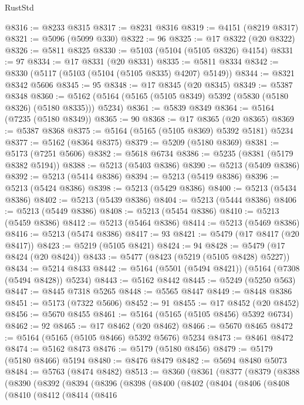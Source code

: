 \begin{lexlean}{RustStd}
\begin{coremodule}
@8316 := @8233 @8315
@8317 := @8231 @8316
@8319 := @4151 (@8219 @8317)
@8321 := @5096 (@5099 @330)
@8322 := 96
@8325 := @17 @8322 (@20 @8322)
@8326 := @5811 @8325
@8330 := @5103 (@5104 (@5105 @8326) @4154)
@8331 := 97
@8334 := @17 @8331 (@20 @8331)
@8335 := @5811 @8334
@8342 := @8330 (@5117 (@5103 (@5104 (@5105 @8335) @4207) @5149))
@8344 := @8321 @8342 @5606
@8345 := 95
@8348 := @17 @8345 (@20 @8345)
@8349 := @5387 @8348
@8360 := @5162 (@5164 (@5165 (@5105 @8349) @5392 (@5830 (@5180 @8326) (@5180 @8335))) @5234)
@8361 := @5839 @8349
@8364 := @5164 (@7235 (@5180 @8349))
@8365 := 90
@8368 := @17 @8365 (@20 @8365)
@8369 := @5387 @8368
@8375 := @5164 (@5165 (@5105 @8369) @5392 @5181) @5234
@8377 := @5162 (@8364 @8375)
@8379 := @5209 (@5180 @8369)
@8381 := @5173 (@7251 @5606)
@8382 := @5618 @6734
@8386 := @5235 (@8381 (@5179 @8382 @5194))
@8388 := @5213 (@5403 @8386)
@8390 := @5213 (@5409 @8386)
@8392 := @5213 (@5414 @8386)
@8394 := @5213 (@5419 @8386)
@8396 := @5213 (@5424 @8386)
@8398 := @5213 (@5429 @8386)
@8400 := @5213 (@5434 @8386)
@8402 := @5213 (@5439 @8386)
@8404 := @5213 (@5444 @8386)
@8406 := @5213 (@5449 @8386)
@8408 := @5213 (@5454 @8386)
@8410 := @5213 (@5459 @8386)
@8412 := @5213 (@5464 @8386)
@8414 := @5213 (@5469 @8386)
@8416 := @5213 (@5474 @8386)
@8417 := 93
@8421 := @5479 (@17 @8417 (@20 @8417))
@8423 := @5219 (@5105 @8421)
@8424 := 94
@8428 := @5479 (@17 @8424 (@20 @8424))
@8433 := @5477 (@8423 (@5219 (@5105 @8428) @5227))
@8434 := @5214 @8433
@8442 := @5164 (@5501 (@5494 @8421)) (@5164 (@7308 (@5494 @8428)) @5234)
@8443 := @5162 @8442
@8445 := @5249 (@5250 @563)
@8447 := @8445 @7318 @5265
@8448 := @5565 @8447
@8449 := @8448 @8386
@8451 := @5173 (@7322 @5606)
@8452 := 91
@8455 := @17 @8452 (@20 @8452)
@8456 := @5670 @8455
@8461 := @5164 (@5165 (@5105 @8456) @5392 @6734)
@8462 := 92
@8465 := @17 @8462 (@20 @8462)
@8466 := @5670 @8465
@8472 := @5164 (@5165 (@5105 @8466) @5392 @5676) @5234
@8473 := @8461 @8472
@8474 := @5162 @8473
@8476 := @5179 (@5180 @8456)
@8479 := @5179 (@5180 @8466) @5194
@8480 := @8476 @8479
@8482 := @5694 @8480 @5073
@8484 := @5763 (@8474 @8482)
@8513 := @8360
    (@8361
      (@8377
        (@8379
          (@8388
            (@8390
              (@8392
                (@8394
                  (@8396
                    (@8398
                      (@8400
                        (@8402
                          (@8404
                            (@8406
                              (@8408
                                (@8410
                                  (@8412
                                    (@8414
                                      (@8416

\end{coremodule}
\end{lexlean}
